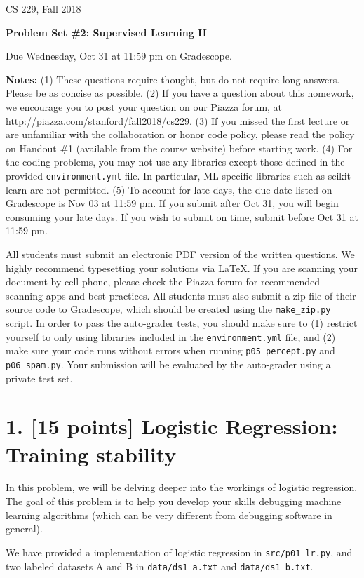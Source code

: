 \documentclass[11pt]{article}
\newcommand{\problem}[2]{\clearpage\section*{#1. #2}}
\newcommand{\code}[1]{\nolinkurl{#1}}
\begin{document}
{\Large CS 229, Fall 2018}\par
{\LARGE\bfseries Problem Set \#2: Supervised Learning II}

Due Wednesday, Oct 31 at 11:59 pm on Gradescope.

\textbf{Notes:} (1) These questions require thought, but do not require long answers. Please be as concise as possible. (2) If you have a question about this homework, we encourage you to post your question on our Piazza forum, at \url{http://piazza.com/stanford/fall2018/cs229}. (3) If you missed the first lecture or are unfamiliar with the collaboration or honor code policy, please read the policy on Handout \#1 (available from the course website) before starting work. (4) For the coding problems, you may not use any libraries except those defined in the provided \code{environment.yml} file. In particular, ML-specific libraries such as scikit-learn are not permitted. (5) To account for late days, the due date listed on Gradescope is Nov 03 at 11:59 pm. If you submit after Oct 31, you will begin consuming your late days. If you wish to submit on time, submit before Oct 31 at 11:59 pm.

All students must submit an electronic PDF version of the written questions. We highly recommend typesetting your solutions via \LaTeX. If you are scanning your document by cell phone, please check the Piazza forum for recommended scanning apps and best practices. All students must also submit a zip file of their source code to Gradescope, which should be created using the \code{make_zip.py} script. In order to pass the auto-grader tests, you should make sure to (1) restrict yourself to only using libraries included in the \code{environment.yml} file, and (2) make sure your code runs without errors when running \code{p05_percept.py} and \code{p06_spam.py}. Your submission will be evaluated by the auto-grader using a private test set.

\problem{1}{[15 points] Logistic Regression: Training stability}
In this problem, we will be delving deeper into the workings of logistic regression. The goal of this problem is to help you develop your skills debugging machine learning algorithms (which can be very different from debugging software in general).

We have provided a implementation of logistic regression in \code{src/p01_lr.py}, and two labeled datasets A and B in \code{data/ds1_a.txt} and \code{data/ds1_b.txt}.
\end{document}
